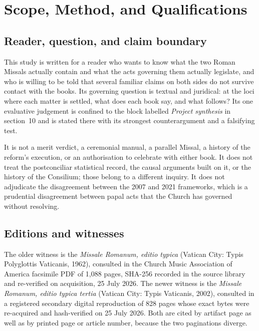 \section{Scope, Method, and Qualifications}

\subsection*{Reader, question, and claim boundary}

This study is written for a reader who wants to know what the two Roman Missals actually contain and what the acts governing them actually legislate, and who is willing to be told that several familiar claims on both sides do not survive contact with the books. Its governing question is textual and juridical: at the loci where each matter is settled, what does each book say, and what follows? Its one evaluative judgement is confined to the block labelled \emph{Project synthesis} in section~10 and is stated there with its strongest counterargument and a falsifying test.

It is not a merit verdict, a ceremonial manual, a parallel Missal, a history of the reform's execution, or an authorisation to celebrate with either book. It does not treat the postconciliar statistical record, the causal arguments built on it, or the history of the Consilium; those belong to a different inquiry. It does not adjudicate the disagreement between the 2007 and 2021 frameworks, which is a prudential disagreement between papal acts that the Church has governed without resolving.

\subsection*{Editions and witnesses}

The older witness is the \emph{Missale Romanum, editio typica} (Vatican City: Typis Polyglottis Vaticanis, 1962), consulted in the Church Music Association of America facsimile PDF of 1,088 pages, SHA-256 recorded in the source library and re-verified on acquisition, 25 July 2026. The newer witness is the \emph{Missale Romanum, editio typica tertia} (Vatican City: Typis Vaticanis, 2002), consulted in a registered secondary digital reproduction of 828 pages whose exact bytes were re-acquired and hash-verified on 25 July 2026. Both are cited by artifact page as well as by printed page or article number, because the two paginations diverge.

